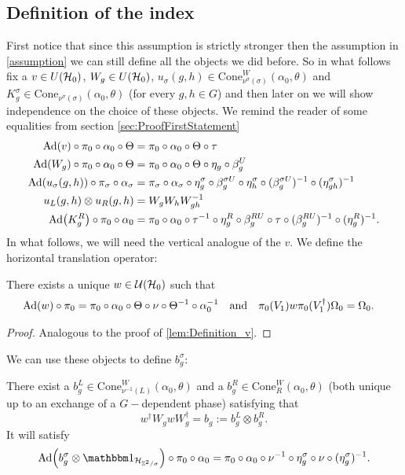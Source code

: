\documentclass[12pt,a4paper,twoside]{article}
\numberwithin{equation}{section}
\begin{document}
\subsection{Definition of the index}\label{sec:DefinitionH1Index}
 First notice that since this assumption is strictly stronger then the assumption in \ref{assumption} we can still define all the objects we did before. So in what follows fix a $v\in U(\mathcal H_0)$, $W_g\in U(\mathcal H_0)$, $u_\sigma(g,h)\in \textrm{Cone}_{\nu^\sigma(\sigma)}^W(\alpha_0,\theta)$ and $K_g^\sigma\in\textrm{Cone}_{\nu^\sigma(\sigma)}(\alpha_0,\theta)$ (for every $g,h\in G$) and then later on we will show independence on the choice of these objects. We remind the reader of some equalities from section \ref{sec:ProofFirstStatement}
\begin{align}
		\Ad{v}\circ\pi_0\circ\alpha_0\circ\Theta&=\pi_0\circ\alpha_0\circ\Theta\circ\tau\\
		\Ad{W_g}\circ\pi_0\circ\alpha_0\circ\Theta&=\pi_0\circ\alpha_0\circ\Theta\circ\eta_g\circ\beta_g^U\\
		\Ad{u_\sigma(g,h)}\circ\pi_\sigma\circ\alpha_\sigma&=\pi_\sigma\circ\alpha_\sigma\circ\eta_g^\sigma\circ\beta_g^{\sigma U}\circ\eta_h^{\sigma}\circ(\beta_g^{\sigma U})^{-1}\circ(\eta^\sigma_{gh})^{-1}\\
		u_L(g,h)\otimes u_R(g,h)&=W_gW_hW_{gh}^{-1}\\
		\Ad{K^R_g}\circ\pi_0\circ\alpha_0&=\pi_0\circ \alpha_0\circ \tau^{-1}\circ \eta_g^R\circ\beta_g^{RU}\circ\tau\circ(\beta_g^{RU})^{-1}\circ(\eta_g^{R})^{-1}.
	\end{align}
In what follows, we will need the vertical analogue of the $v$. We define the horizontal translation operator:
\begin{lemma}\label{lem:Definition_w}
	There exists a unique $w\in\mathcal U(\mathcal H_0)$ such that
	\begin{align}
		\Ad{w}\circ\pi_0&=\pi_0\circ\alpha_0\circ\Theta\circ\nu\circ\Theta^{-1}\circ\alpha_0^{-1}&&\text{and}&\pi_0(V_1)w\pi_0(V_1^\dagger)\Omega_0&=\Omega_0.
	\end{align}
\end{lemma}
\begin{proof}
	Analogous to the proof of \ref{lem:Definition_v}.
\end{proof}
 We can use these objects to define $b^\sigma_g$:
\begin{lemma}
	There exist a $b_g^L\in\textrm{Cone}_{\nu^{-1}(L)}^W(\alpha_0,\theta)$ and a $b_g^R\in\textrm{Cone}_{R}^W(\alpha_0,\theta)$ (both unique up to an exchange of a $G-$dependent phase) satisfying that
	\begin{equation}
		w^\dagger W_g w W_g^\dagger=b_g:=b_g^L\otimes b_g^R.
	\end{equation}
	It will satisfy
	\begin{equation}\label{eq:automorphismBelongingTo_b}
		\Ad{b_g^\sigma\otimes\id_{\HH_{\ZZ^2/\sigma}}}\circ\pi_0\circ\alpha_0=\pi_0\circ\alpha_0\circ\nu^{-1}\circ\eta_g^\sigma\circ\nu\circ(\eta_g^\sigma)^{-1}.
	\end{equation}
\end{lemma}
\end{document}
